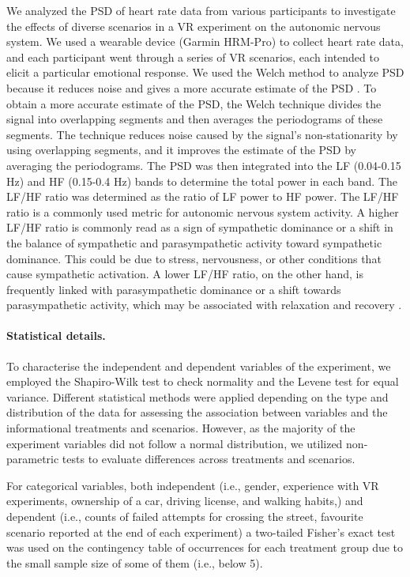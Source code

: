 We analyzed the PSD of heart rate data from various participants to investigate the effects of diverse scenarios in a VR experiment on the autonomic nervous system. We used a wearable device (Garmin HRM-Pro) to collect heart rate data, and each participant went through a series of VR scenarios, each intended to elicit a particular emotional response. We used the Welch method to analyze PSD because it reduces noise and gives a more accurate estimate of the PSD \cite{welch1967use}. To obtain a more accurate estimate of the PSD, the Welch technique divides the signal into overlapping segments and then averages the periodograms of these segments. The technique reduces noise caused by the signal's non-stationarity by using overlapping segments, and it improves the estimate of the PSD by averaging the periodograms. The PSD was then integrated into the LF (0.04-0.15 Hz) and HF (0.15-0.4 Hz) bands to determine the total power in each band. The LF/HF ratio was determined as the ratio of LF power to HF power. The LF/HF ratio is a commonly used metric for autonomic nervous system activity. A higher LF/HF ratio is commonly read as a sign of sympathetic dominance or a shift in the balance of sympathetic and parasympathetic activity toward sympathetic dominance. This could be due to stress, nervousness, or other conditions that cause sympathetic activation. A lower LF/HF ratio, on the other hand, is frequently linked with parasympathetic dominance or a shift towards parasympathetic activity, which may be associated with relaxation and recovery \cite{shaffer2017overview}.  

\paragraph{Statistical details.}\label{sec:stat_details}

To characterise the independent and dependent variables of the experiment, we employed the Shapiro-Wilk test \cite{Shapiro1965} to check normality and the Levene test \cite{Conover1981} for equal variance. Different statistical methods were applied depending on the type and distribution of the data for assessing the association between variables and the informational treatments and scenarios. However, as the majority of the experiment variables did not follow a normal distribution, we utilized non-parametric tests to evaluate differences across treatments and scenarios.

For categorical variables, both independent (i.e., gender, experience with VR experiments, ownership of a car, driving license, and walking habits,) and dependent (i.e., counts of failed attempts for crossing the street, favourite scenario reported at the end of each experiment) a two-tailed Fisher's exact test \cite{Fisher1922} was used on the contingency table of occurrences for each treatment group due to the small sample size of some of them (i.e., below 5).

